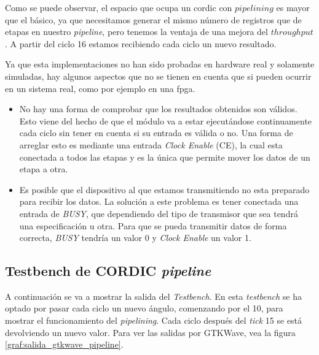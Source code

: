 Como se puede observar, el espacio que ocupa un \gls{cordic} con $pipelining$ es mayor que el básico, ya que necesitamos generar el mismo número de registros que de etapas en nuestro \textit{pipeline}, pero tenemos la ventaja de una mejora del $throughput$. A partir del ciclo 16 estamos recibiendo cada ciclo un nuevo resultado.

Ya que esta implementaciones no han sido probadas en hardware real y solamente simuladas, hay algunos aspectos que no se tienen en cuenta que si pueden ocurrir en un sistema real, como por ejemplo en una \gls{fpga}.

\begin{itemize}
	\item No hay una forma de comprobar que los resultados obtenidos son válidos. Esto viene del hecho de que el módulo va a estar ejecutándose continuamente cada ciclo sin tener en cuenta si su entrada es válida o no. Una forma de arreglar esto es mediante una entrada \textit{Clock Enable} (CE), la cual esta conectada a todos las etapas y es la única que permite mover los datos de un etapa a otra.
	
	\item Es posible que el dispositivo al que estamos transmitiendo no esta preparado para recibir los datos. La solución a este problema es tener conectada una entrada de \textit{BUSY}, que dependiendo del tipo de transmisor que sea tendrá una especificación u otra. Para que se pueda transmitir datos de forma correcta, \textit{BUSY} tendría un valor 0 y \textit{Clock Enable} un valor 1.
\end{itemize}

\subsection{Testbench de CORDIC \textit{pipeline}}
A continuación se va a mostrar la salida del \textit{Testbench}. En esta \textit{testbench} se ha optado por pasar cada ciclo un nuevo ángulo, comenzando por el 10, para mostrar el funcionamiento del \textit{pipelining}. Cada ciclo después del \textit{tick} 15 se está devolviendo un nuevo valor. Para ver las salidas por GTKWave, vea la figura \ref{graf:salida_gtkwave_pipeline}.

